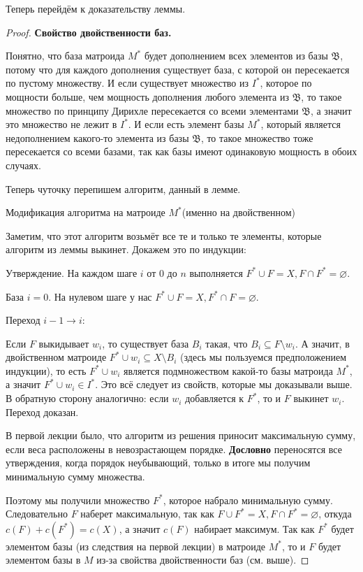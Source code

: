 Теперь перейдём к доказательству леммы.

\begin{proof}

{\bf Свойство двойственности баз.}

Понятно, что база матроида $M^*$ будет дополнением всех элементов из базы $\mathfrak{B}$,
потому что для каждого дополнения существует база, с которой он пересекается по
пустому множеству. И если существует множество из $I^*$, которое по мощности
больше, чем мощность дополнения любого элемента из $\mathfrak{B}$, то такое
множество по принципу Дирихле пересекается со всеми элементами $\mathfrak{B}$,
а значит это множество не лежит в $I^*$. И если есть элемент базы $M^*$, который является недополнением
какого-то
элемента из базы $\mathfrak{B}$, то такое множество тоже пересекается со всеми
базами, так как базы имеют одинаковую мощность в обоих случаях.

Теперь чуточку перепишем алгоритм, данный в лемме.

\begin{algorithm}
  \caption{Модификация алгоритма на матроиде $M^*$(именно на двойственном)}
    \begin{algorithmic}[1]
        \EndIf
      \EndFor
    \end{algorithmic}
\end{algorithm}

Заметим, что этот алгоритм возьмёт все те и только те элементы, которые алгоритм
из леммы выкинет. Докажем это по индукции:

Утверждение. На каждом шаге $i$ от 0 до $n$ выполняется $F^* \cup F = X, F \cap
F^* = \varnothing$.

База $i = 0$. На нулевом шаге у нас $F^* \cup F = X, F^* \cap F = \varnothing$.

Переход $i - 1 \to i$:

Если $F$ выкидывает $w_i$, то существует база $B_i$ такая, что $B_i
\subseteq F \setminus w_i$. А значит, в двойственном матроиде $F^* \cup w_i \subseteq
X \setminus B_i$ (здесь мы пользуемся предположением индукции), то есть $F^* 
\cup w_i$ является подмножеством какой-то базы 
матроида $M^*$, а значит $F^* \cup w_i \in I^*$. Это всё следует из свойств,
которые мы доказывали выше. В обратную сторону аналогично: если $w_i$ добавляется
к $F^*$, то и $F$ выкинет $w_i$. Переход доказан.

В первой лекции было, что алгоритм из решения приносит максимальную сумму, если веса
расположены в невозрастающем порядке. {\bf Дословно} переносятся все утверждения,
когда порядок неубывающий, только в итоге мы получим минимальную сумму множества.

Поэтому мы получили множество $F^*$, которое набрало минимальную сумму. Следовательно
$F$ наберет максимальную, так как $F \cup F^* = X, F \cap F^* = \varnothing$, откуда
$c(F) + c(F^*) = c(X)$, а значит $c(F)$ набирает максимум. Так как $F^*$
будет элементом базы (из следствия на первой лекции) в матроиде $M^*$, то и $F$ будет
элементом базы в $M$ из-за
свойства двойственности баз (см. выше).
\end{proof}


